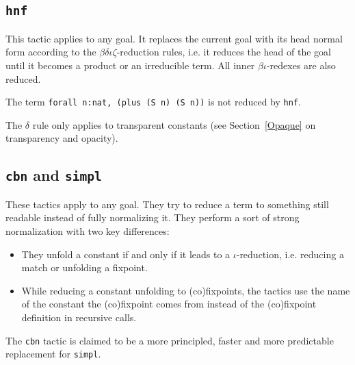 \begin{coq_example*}
\subsection{\tt hnf}

This tactic applies to any goal. It replaces the current goal with its
head normal form according to the $\beta\delta\iota\zeta$-reduction
rules, i.e.  it reduces the head of the goal until it becomes a
product or an irreducible term. All inner $\beta\iota$-redexes are also
reduced.

\Example
The term \verb+forall n:nat, (plus (S n) (S n))+ is not reduced by {\tt hnf}.

\Rem The $\delta$ rule only applies to transparent constants
(see Section~\ref{Opaque} on transparency and opacity).

\subsection{\texorpdfstring{\texttt{cbn}}{cbn} and \texorpdfstring{\texttt{simpl}}{simpl}}
 

These tactics apply to any goal. They try to reduce a term to
something still readable instead of fully normalizing it. They perform
a sort of strong normalization with two key differences:
\begin{itemize}
\item They unfold a constant if and only if it leads to a
  $\iota$-reduction, i.e. reducing a match or unfolding a fixpoint.
\item While reducing a constant unfolding to (co)fixpoints,
  the tactics use the name of the
  constant the (co)fixpoint comes from instead of the (co)fixpoint
  definition in recursive calls.
\end{itemize}

The \texttt{cbn} tactic is claimed to be a more principled, faster and more
predictable replacement for \texttt{simpl}.


\end{coq_example*}
